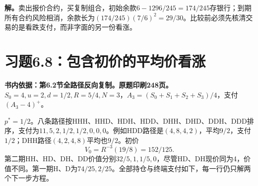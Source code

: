 \documentclass[11pt,a4paper,UTF8,fontset=fandol]{ctexart}
\begin{document}
\textbf{解。}卖出报价合约，买复制组合，初始余款\(6-1296/245=174/245\)存银行；到期所有合约风险相消，余款长为\((174/245)(7/6)^2=\boxed{29/30}\)。比较前必须先核清交易的是看跌支付，而非字面的另一份看涨。

\bigskip

\section{习题6.8：包含初价的平均价看涨}\label{ux4e60ux98986.8ux5305ux542bux521dux4ef7ux7684ux5e73ux5747ux4ef7ux770bux6da8}

\textbf{书内依据：第6.2节全路径反向复制。原题印刷248页。}\(S_0=4,u=2,d=1/2,R=5/4,N=3\)，\(A_3=(S_0+S_1+S_2+S_3)/4\)，支付\((A_3-4)^+\)。

\(p^*=1/2\)。八条路径按HHH、HHD、HDH、HDD、DHH、DHD、DDH、DDD排序，支付为\(11,5,2,1/2,1/2,0,0,0\)。例如HDD路径是\((4,8,4,2)\)，平均\(9/2\)，支付\(1/2\)；DHH路径\((4,2,4,8)\)平均也\(9/2\)。初价
\[\boxed{V_0=R^{-3}(19/8)=152/125.}\]
第二期HH、HD、DH、DD价值分别\(32/5,1,1/5,0\)，尽管HD、DH现价同为4，价值不同。第一期H、D为\(74/25,2/25\)。全部持仓与终端支付如下，每一行仍只解两个下一步方程。

\begingroup
\small
\setlength{\tabcolsep}{4pt}
\renewcommand{\arraystretch}{1.10}
\end{document}
